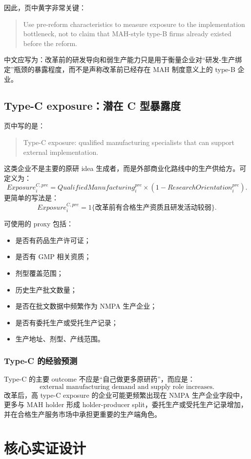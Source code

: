\documentclass[12pt]{ctexart}
\begin{document}
因此，页中黄字非常关键：
\begin{quote}
Use pre-reform characteristics to measure exposure to the implementation bottleneck, not to claim that MAH-style type-B firms already existed before the reform.
\end{quote}
中文应写为：改革前的研发导向和弱生产能力只是用于衡量企业对“研发-生产绑定”瓶颈的暴露程度，而不是声称改革前已经存在 MAH 制度意义上的 type-B 企业。

\subsection{Type-C exposure：潜在 C 型暴露度}

页中写的是：
\begin{quote}
Type-C exposure: qualified manufacturing specialists that can support external implementation.
\end{quote}
这类企业不是主要的原研 idea 生成者，而是外部商业化路线中的生产供给方。可定义为：
\[
Exposure_i^{C,pre}=QualifiedManufacturing_i^{pre}\times (1-ResearchOrientation_i^{pre}).
\]
更简单的写法是：
\[
Exposure_i^{C,pre}=1\{\text{改革前有合格生产资质且研发活动较弱}\}.
\]

可使用的 proxy 包括：
\begin{itemize}
    \item 是否有药品生产许可证；
    \item 是否有 GMP 相关资质；
    \item 剂型覆盖范围；
    \item 历史生产批文数量；
    \item 是否在批文数据中频繁作为 NMPA 生产企业；
    \item 是否有委托生产或受托生产记录；
    \item 生产地址、剂型、产线范围。
\end{itemize}

\subsubsection*{Type-C 的经验预测}

Type-C 的主要 outcome 不应是“自己做更多原研药”，而应是：
\[
\text{external manufacturing demand and supply role increases.}
\]
改革后，高 type-C exposure 的企业可能更频繁出现在 NMPA 生产企业字段中，更多与 MAH holder 形成 holder-producer split，委托生产或受托生产记录增加，并在合格生产服务市场中承担更重要的生产端角色。

\section{核心实证设计}
\end{document}
